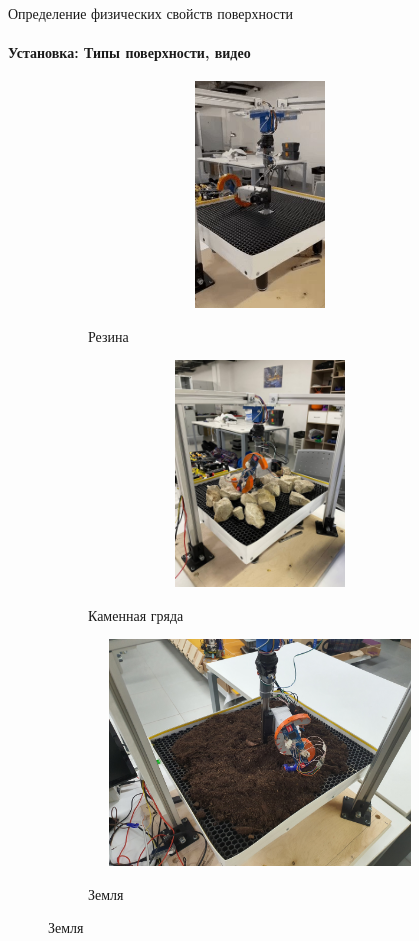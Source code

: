 \documentclass[aspectratio=169,xcolor=table]{beamer}
\begin{document}
\begin{frame}[t]{Определение физических свойств поверхности}
    \framesubtitle{Установка: Типы поверхности, видео}
    \vspace{-15pt}
    \begin{figure}[H]
        \begin{subfigure}{0.22\textwidth}
            \href{https://gifyu.com/image/SxatY}
            {\centering\includegraphics[height=6cm,width=1\textwidth,keepaspectratio]{s_shape_leg/flat.jpg}} 
            \caption*{Резина}
        \end{subfigure}
        \hfill
        \begin{subfigure}{0.26\textwidth}
            \href{https://gifyu.com/image/Sxatt}
            {\centering\includegraphics[height=6cm,width=1\textwidth,keepaspectratio]{s_shape_leg/view.jpg}}
            \caption*{Каменная гряда}
        \end{subfigure}
        \begin{subfigure}{0.5\textwidth}
            {\centering\includegraphics[height=6cm,width=1\textwidth,keepaspectratio]{s_shape_leg/mould.jpg}}
            \caption*{Земля}
        \end{subfigure}
    \end{figure}
\end{frame}
\end{document}
